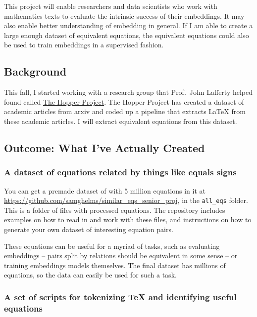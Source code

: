 \documentclass[]{article}
\begin{document}
This project will enable researchers and data scientists who work with
mathematics texts to evaluate the intrinsic success of their embeddings.
It may also enable better understanding of embedding in general. If I am
able to create a large enough dataset of equivalent equations, the
equivalent equations could also be used to train embeddings in a
supervised fashion.

\hypertarget{background}{%
\subsection{Background}\label{background}}

This fall, I started working with a research group that Prof.~John
Lafferty helped found called
\href{https://github.com/hopper-project}{The Hopper Project}. The Hopper
Project has created a dataset of academic articles from arxiv and coded
up a pipeline that extracts LaTeX from these academic articles. I will
extract equivalent equations from this dataset.

\hypertarget{outcome-what-ive-actually-created}{%
\subsection{Outcome: What I've Actually
Created}\label{outcome-what-ive-actually-created}}

\hypertarget{a-dataset-of-equations-related-by-things-like-equals-signs}{%
\subsubsection{A dataset of equations related by things like equals
signs}\label{a-dataset-of-equations-related-by-things-like-equals-signs}}

You can get a premade dataset of with 5 million equations in it at
\url{https://github.com/samghelms/similar_eqs_senior_proj}, in the
\texttt{all\_eqs} folder. This is a folder of files with processed
equations. The repository includes examples on how to read in and work
with these files, and instructions on how to generate your own dataset
of interesting equation pairs.

These equations can be useful for a myriad of tasks, such as evaluating
embeddings -- pairs split by relations should be equivalent in some
sense -- or training embeddings models themselves. The final dataset has
millions of equations, so the data can easily be used for such a task.

\hypertarget{a-set-of-scripts-for-tokenizing-tex-and-identifying-useful-equations}{%
\subsubsection{A set of scripts for tokenizing TeX and identifying
useful
equations}\label{a-set-of-scripts-for-tokenizing-tex-and-identifying-useful-equations}}
\end{document}
